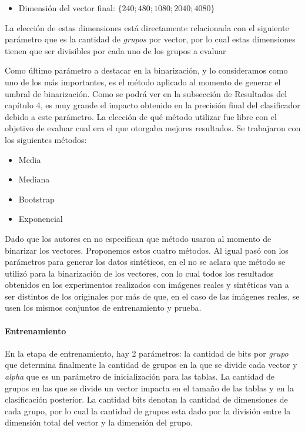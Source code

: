 	\begin{itemize}
		\item Dimensión del vector final: $\{ 240; 480; 1080; 2040;  4080 \}$
	\end{itemize}
	
	La elección de estas dimensiones está directamente relacionada con el siguiente parámetro que es la cantidad de \textit{grupos} por vector, por lo cual estas dimensiones tienen que ser divisibles por cada uno de los grupos a evaluar
	
	Como último parámetro a destacar en la binarización, y lo consideramos como uno de los más importantes, es el método aplicado al momento de generar el umbral de binarización. Como se podrá ver en la subsección de Resultados del capítulo 4, es muy grande el impacto obtenido en la precisión final del clasificador debido a este parámetro. La elección de qué método utilizar fue libre con el objetivo de evaluar cual era el que otorgaba mejores resultados. Se trabajaron con los siguientes métodos:

	\begin{itemize}
		\item Media
		\item Mediana
		\item Bootstrap
		\item Exponencial
	\end{itemize}
	
	Dado que los autores en \cite{wang} no especifican que método usaron al momento de binarizar los vectores. Proponemos estos cuatro métodos. Al igual pasó con los parámetros para generar los datos sintéticos, en el \cite{wang} no se aclara que método se utilizó para la binarización de los vectores, con lo cual todos los resultados obtenidos en los experimentos realizados con imágenes reales y sintéticas van a ser distintos de los originales por más de que, en el caso de las imágenes reales, se usen los mismos conjuntos de entrenamiento y prueba. 
		
	\paragraph{Entrenamiento}

	En la etapa de entrenamiento, hay 2 parámetros: la cantidad de bits por \textit{grupo} que determina finalmente la cantidad de grupos en la que se divide cada vector y \textit{alpha} que es un parámetro de inicialización para las tablas. La cantidad de grupos en las que se divide un vector impacta en el tamaño de las tablas y en la clasificación posterior. La cantidad bits denotan la cantidad de dimensiones de cada grupo, por lo cual  la cantidad de grupos esta dado por la división entre la dimensión total del vector y la dimensión del grupo.

